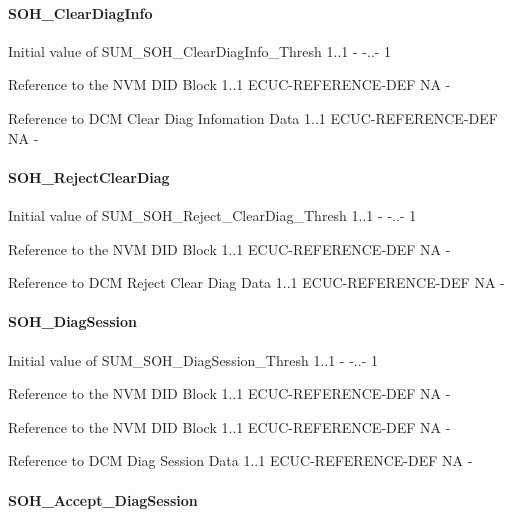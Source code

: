 {{{{{{{{{{{{{\paragraph{SOH_ClearDiagInfo}

{
{Initial value of SUM_SOH_ClearDiagInfo_Thresh}
{1..1}
{-}
{-..-}
{1}}

{
{Reference to the NVM DID Block}
{1..1}
{ECUC-REFERENCE-DEF}
{NA}
{-}}

{
{Reference to DCM Clear Diag Infomation Data}
{1..1}
{ECUC-REFERENCE-DEF}
{NA}
{-}}

\paragraph{SOH_RejectClearDiag}

{
{Initial value of SUM_SOH_Reject_ClearDiag_Thresh}
{1..1}
{-}
{-..-}
{1}}

{
{Reference to the NVM DID Block}
{1..1}
{ECUC-REFERENCE-DEF}
{NA}
{-}}

{
{Reference to DCM Reject Clear Diag Data}
{1..1}
{ECUC-REFERENCE-DEF}
{NA}
{-}}

\paragraph{SOH_DiagSession}

{
{Initial value of SUM_SOH_DiagSession_Thresh}
{1..1}
{-}
{-..-}
{1}}

{
{Reference to the NVM DID Block}
{1..1}
{ECUC-REFERENCE-DEF}
{NA}
{-}}

{
{Reference to the NVM DID Block}
{1..1}
{ECUC-REFERENCE-DEF}
{NA}
{-}}

{
{Reference to DCM Diag Session Data}
{1..1}
{ECUC-REFERENCE-DEF}
{NA}
{-}}

\paragraph{SOH_Accept_DiagSession}

}}}}}}}}}}}}}
